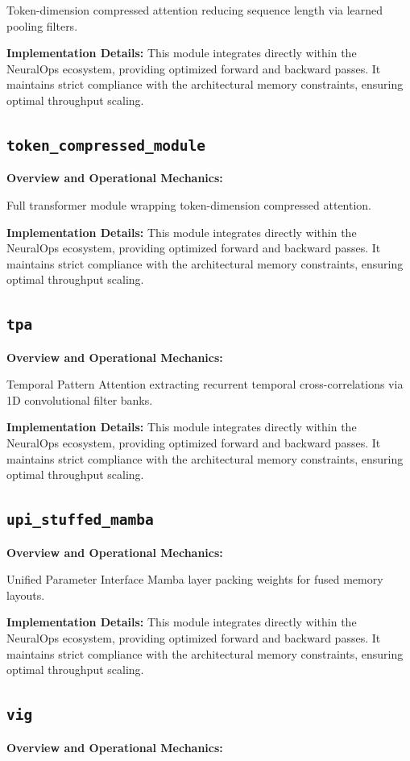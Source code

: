 \documentclass[10pt,twocolumn,letterpaper]{article}
\begin{document}
Token-dimension compressed attention reducing sequence length via learned pooling filters.

\textbf{Implementation Details:}
This module integrates directly within the NeuralOps ecosystem, providing optimized forward and backward passes. It maintains strict compliance with the architectural memory constraints, ensuring optimal throughput scaling.

\subsection{\texttt{token\_compressed\_module}}
\textbf{Overview and Operational Mechanics:}

Full transformer module wrapping token-dimension compressed attention.

\textbf{Implementation Details:}
This module integrates directly within the NeuralOps ecosystem, providing optimized forward and backward passes. It maintains strict compliance with the architectural memory constraints, ensuring optimal throughput scaling.

\subsection{\texttt{tpa}}
\textbf{Overview and Operational Mechanics:}

Temporal Pattern Attention extracting recurrent temporal cross-correlations via 1D convolutional filter banks.

\textbf{Implementation Details:}
This module integrates directly within the NeuralOps ecosystem, providing optimized forward and backward passes. It maintains strict compliance with the architectural memory constraints, ensuring optimal throughput scaling.

\subsection{\texttt{upi\_stuffed\_mamba}}
\textbf{Overview and Operational Mechanics:}

Unified Parameter Interface Mamba layer packing weights for fused memory layouts.

\textbf{Implementation Details:}
This module integrates directly within the NeuralOps ecosystem, providing optimized forward and backward passes. It maintains strict compliance with the architectural memory constraints, ensuring optimal throughput scaling.

\subsection{\texttt{vig}}
\textbf{Overview and Operational Mechanics:}
\end{document}
